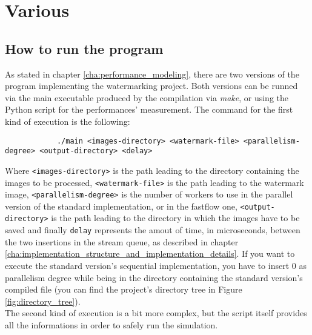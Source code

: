\chapter{Various} %
\label{cha:various}
    \section{How to run the program} %
    \label{sec:how_to_run_the_program}
        As stated in chapter \ref{cha:performance_modeling}, there are two versions of the program implementing
        the watermarking project. Both versions can be runned via the main executable produced by the compilation
        via \textit{make}, or using the Python script for the performances' measurement. The command for the
        first kind of execution is the following:

        \begin{verbatim}
            ./main <images-directory> <watermark-file> <parallelism-degree> <output-directory> <delay>
        \end{verbatim}

        Where \texttt{<images-directory>} is the path leading to the directory containing the images to be
        processed, \texttt{<watermark-file>} is the path leading to the watermark image,
        \texttt{<parallelism-degree>} is the number of workers to use in the parallel version of the standard
        implementation, or in the fastflow one, \texttt{<output-directory>} is the path leading to the directory
        in which the images have to be saved and finally \texttt{delay} represents the amout of time, in
        microseconds, between the two insertions in the stream queue, as described in chapter
        \ref{cha:implementation_structure_and_implementation_details}.
        If you want to execute the standard version's sequential implementation, you have to insert $0$ as
        parallelism degree while being in the directory containing the standard version's compiled file (you can
        find the project's directory tree in Figure \ref{fig:directory_tree}). \\
        The second kind of execution is a bit more complex, but the script itself provides all the informations
        in order to safely run the simulation.

